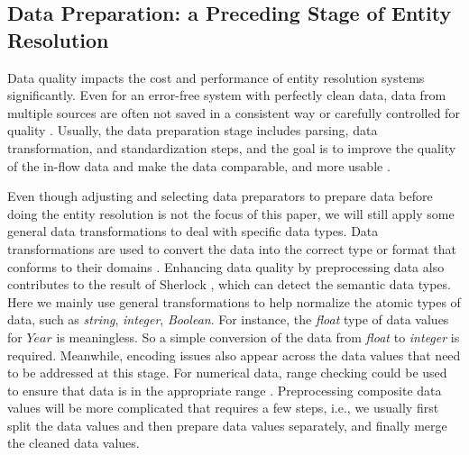 \subsection{Data Preparation: a Preceding Stage of Entity Resolution}

Data quality impacts the cost and performance of entity resolution systems significantly. Even for an error-free system with perfectly clean data, data from multiple sources are often not saved in a consistent way or carefully controlled for quality \cite{elmagarmid_duplicate_2007}. Usually, the data preparation stage includes parsing, data transformation, and standardization steps, and the goal is to improve the quality of the in-flow data and make the data comparable, and more usable \cite{elmagarmid_duplicate_2007}. 

Even though adjusting and selecting data preparators to prepare data before doing the entity resolution is not the focus of this paper, we will still apply some general data transformations to deal with specific data types. Data transformations are used to convert the data into the correct type or format that conforms to their domains \cite{elmagarmid_duplicate_2007}. Enhancing data quality by preprocessing data also contributes to the result of Sherlock \cite{hulsebos_sherlock_2019}, which can detect the semantic data types. Here we mainly use general transformations to help normalize the atomic types of data, such as \textit{string}, \textit{integer}, \textit{Boolean}. For instance, the \textit{float} type of data values for $Year$ is meaningless. So a simple conversion of the data from \textit{float} to \textit{integer} is required. Meanwhile, encoding issues also appear across the data values that need to be addressed at this stage. For numerical data, range checking could be used to ensure that data is in the appropriate range \cite{elmagarmid_duplicate_2007}. Preprocessing composite data values will be more complicated that requires a few steps, i.e., we usually first split the data values and then prepare data values separately, and finally merge the cleaned data values.

